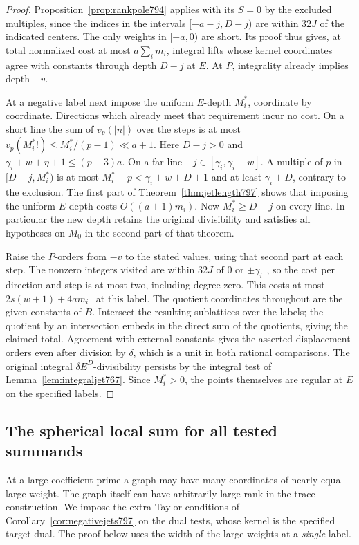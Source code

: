\documentclass[a4paper,11pt]{article}
\theoremstyle{definition}
\theoremstyle{remark}
\numberwithin{equation}{section}
\begin{document}
\begin{proof}
Proposition~\ref{prop:rankpole794} applies with its \(S=0\)
by the excluded multiples, since the indices in the
intervals \([-a-j,D-j)\) are within \(32J\) of the indicated
centers. The only weights in \([-a,0)\) are short. Its proof
thus gives, at total normalized cost at most \(a\sum_i m_i\),
integral lifts whose kernel coordinates agree with constants
through depth \(D-j\) at \(E\). At \(P\), integrality already
implies depth \(-v\).

At a negative label next impose the uniform \(E\)-depth
\(M_i^*\), coordinate by coordinate. Directions which
already meet that requirement incur no cost. On a short line
the sum of \(v_p(|n|)\) over the steps is at most
\(v_p(M_i^*!)\le M_i^*/(p-1)\ll a+1\). Here \(D-j>0\)
and \(\gamma_i+w+\eta+1\le(p-3)a\). On a far line
\(-j\in[\gamma_i,\gamma_i+w]\). A multiple of \(p\) in
\([D-j,M_i^*)\) is at most \(M_i^*-p<\gamma_i+w+D+1\)
and at least \(\gamma_i+D\), contrary to the exclusion.
The first part of Theorem~\ref{thm:jetlength797} shows
that imposing the uniform \(E\)-depth costs \(O((a+1)m_i)\).
Now \(M_i^*\ge D-j\) on every line. In particular the
new depth retains the original divisibility and satisfies
all hypotheses on \(M_0\) in the second part of that theorem.

Raise the \(P\)-orders from \(-v\) to the stated values,
using that second part at each step. The nonzero integers
visited are within \(32J\) of \(0\) or \(\pm\gamma_{i^-}\),
so the cost per direction and step is at most two,
including degree zero. This costs at most
\(2s(w+1)+4a m_{i^-}\) at this label. The quotient
coordinates throughout are the given constants of \(B\).
Intersect the resulting sublattices over the labels; the
quotient by an intersection embeds in the direct sum of
the quotients, giving the claimed total. Agreement with
external constants gives the asserted displacement orders
even after division by \(\delta\), which is a unit in
both rational comparisons. The original integral
\(\delta E^D\)-divisibility persists by the integral
test of Lemma~\ref{lem:integraljet767}. Since \(M_i^*>0\),
the points themselves are regular at \(E\) on the specified
labels.
\end{proof}
\clearpage

\subsection{The spherical local sum for all tested summands}
\label{sec:allspherical798}
At a large coefficient prime a graph may have many coordinates
of nearly equal large weight. The graph itself can have
arbitrarily large rank in the trace construction. We impose
the extra Taylor conditions of Corollary~\ref{cor:negativejets797}
on the dual tests, whose kernel is the specified target dual.
The proof below uses the width of the large weights at a
\emph{single} label.
\end{document}
